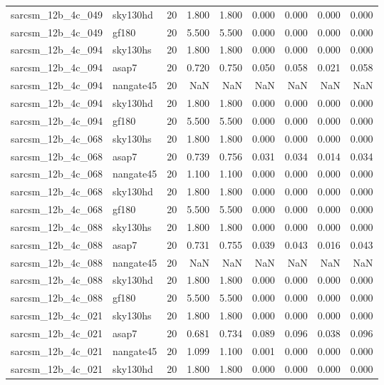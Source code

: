 \begin{tabular}{llrrrrrrr}
sarcsm\_12b\_4c\_049 & sky130hd & 20 & 1.800 & 1.800 & 0.000 & 0.000 & 0.000 & 0.000 \\
sarcsm\_12b\_4c\_049 & gf180 & 20 & 5.500 & 5.500 & 0.000 & 0.000 & 0.000 & 0.000 \\
sarcsm\_12b\_4c\_094 & sky130hs & 20 & 1.800 & 1.800 & 0.000 & 0.000 & 0.000 & 0.000 \\
sarcsm\_12b\_4c\_094 & asap7 & 20 & 0.720 & 0.750 & 0.050 & 0.058 & 0.021 & 0.058 \\
sarcsm\_12b\_4c\_094 & nangate45 & 20 & NaN & NaN & NaN & NaN & NaN & NaN \\
sarcsm\_12b\_4c\_094 & sky130hd & 20 & 1.800 & 1.800 & 0.000 & 0.000 & 0.000 & 0.000 \\
sarcsm\_12b\_4c\_094 & gf180 & 20 & 5.500 & 5.500 & 0.000 & 0.000 & 0.000 & 0.000 \\
sarcsm\_12b\_4c\_068 & sky130hs & 20 & 1.800 & 1.800 & 0.000 & 0.000 & 0.000 & 0.000 \\
sarcsm\_12b\_4c\_068 & asap7 & 20 & 0.739 & 0.756 & 0.031 & 0.034 & 0.014 & 0.034 \\
sarcsm\_12b\_4c\_068 & nangate45 & 20 & 1.100 & 1.100 & 0.000 & 0.000 & 0.000 & 0.000 \\
sarcsm\_12b\_4c\_068 & sky130hd & 20 & 1.800 & 1.800 & 0.000 & 0.000 & 0.000 & 0.000 \\
sarcsm\_12b\_4c\_068 & gf180 & 20 & 5.500 & 5.500 & 0.000 & 0.000 & 0.000 & 0.000 \\
sarcsm\_12b\_4c\_088 & sky130hs & 20 & 1.800 & 1.800 & 0.000 & 0.000 & 0.000 & 0.000 \\
sarcsm\_12b\_4c\_088 & asap7 & 20 & 0.731 & 0.755 & 0.039 & 0.043 & 0.016 & 0.043 \\
sarcsm\_12b\_4c\_088 & nangate45 & 20 & NaN & NaN & NaN & NaN & NaN & NaN \\
sarcsm\_12b\_4c\_088 & sky130hd & 20 & 1.800 & 1.800 & 0.000 & 0.000 & 0.000 & 0.000 \\
sarcsm\_12b\_4c\_088 & gf180 & 20 & 5.500 & 5.500 & 0.000 & 0.000 & 0.000 & 0.000 \\
sarcsm\_12b\_4c\_021 & sky130hs & 20 & 1.800 & 1.800 & 0.000 & 0.000 & 0.000 & 0.000 \\
sarcsm\_12b\_4c\_021 & asap7 & 20 & 0.681 & 0.734 & 0.089 & 0.096 & 0.038 & 0.096 \\
sarcsm\_12b\_4c\_021 & nangate45 & 20 & 1.099 & 1.100 & 0.001 & 0.000 & 0.000 & 0.000 \\
sarcsm\_12b\_4c\_021 & sky130hd & 20 & 1.800 & 1.800 & 0.000 & 0.000 & 0.000 & 0.000 \\

\end{tabular}
